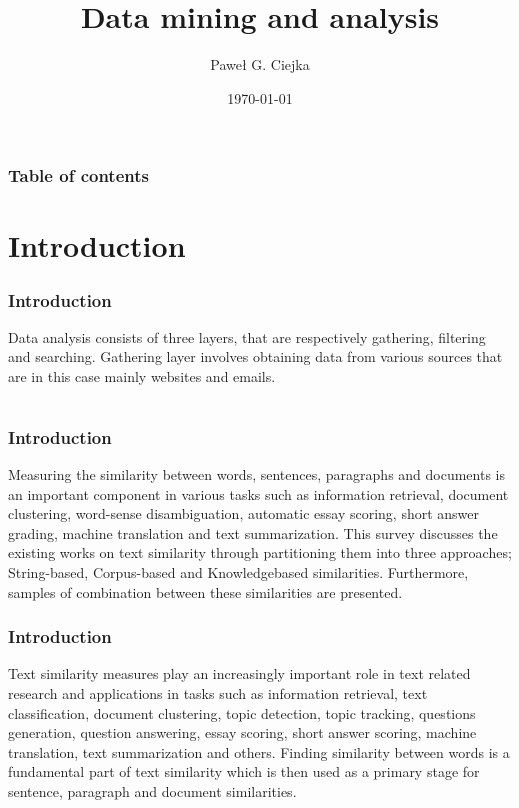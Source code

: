 \documentclass{beamer}
\title[Data mining and analysis]{Data mining and analysis}
\author[Ciejka, P. G.]{Paweł G. Ciejka}
\date{\today}
\begin{document}
\begin{frame}
 \maketitle
\end{frame}

\begin{frame}
\frametitle{Table of contents}
 \tableofcontents
\end{frame}

\section{Introduction}
\begin{frame}
    \frametitle{Introduction}
    \begin{minipage}{\textwidth}
        Data analysis consists of three layers, that are respectively gathering, filtering and searching.
        Gathering layer involves obtaining data from various sources that are in this case mainly websites and emails. 
    \end{minipage}
\end{frame} 




\section{}
\begin{frame}
    \frametitle{Introduction}
    \begin{minipage}{\textwidth}
        Measuring the similarity between words, sentences,
        paragraphs and documents is an important component in
        various tasks such as information retrieval, document
        clustering, word-sense disambiguation, automatic essay
        scoring, short answer grading, machine translation and text
        summarization. This survey discusses the existing works on
        text similarity through partitioning them into three
        approaches; String-based, Corpus-based and Knowledgebased
        similarities. Furthermore, samples of combination
        between these similarities are presented.
    \end{minipage}
\end{frame}    

\begin{frame}
    \frametitle{Introduction}
    \begin{minipage}{\textwidth}
        Text similarity measures play an increasingly important role
        in text related research and applications in tasks such as
        information retrieval, text classification, document clustering,
        topic detection, topic tracking, questions generation, question
        answering, essay scoring, short answer scoring, machine
        translation, text summarization and others. Finding similarity
        between words is a fundamental part of text similarity which
        is then used as a primary stage for sentence, paragraph and
        document similarities.      
    \end{minipage}
\end{frame}        
 
\end{document}
